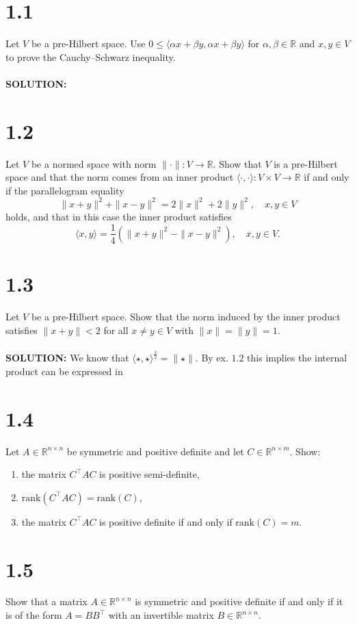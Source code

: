 \documentclass{article}
\begin{document}
\section*{1.1}
Let $V$ be a pre-Hilbert space. Use $0 \leq \langle \alpha x + \beta y, \alpha x + \beta y \rangle$ for $\alpha, \beta \in \mathbb{R}$ and $x, y \in V$ to prove the Cauchy–Schwarz inequality.
\\
\\
\noindent \textbf{SOLUTION: }

\section*{1.2}
Let $V$ be a normed space with norm $\| \cdot \| : V \to \mathbb{R}$. Show that $V$ is a pre-Hilbert space and that the norm comes from an inner product $\langle \cdot, \cdot \rangle : V \times V \to \mathbb{R}$ if and only if the parallelogram equality
\[
\|x + y\|^2 + \|x - y\|^2 = 2\|x\|^2 + 2\|y\|^2, \quad x, y \in V
\]
holds, and that in this case the inner product satisfies
\[
\langle x, y \rangle = \frac{1}{4} \left( \|x + y\|^2 - \|x - y\|^2 \right), \quad x, y \in V.
\]

\section*{1.3}
Let $V$ be a pre-Hilbert space. Show that the norm induced by the inner product satisfies $\|x + y\| < 2$ for all $x \neq y \in V$ with $\|x\| = \|y\| = 1$.
\\
\\
\noindent \textbf{SOLUTION: }
We know that $\langle \star, \star \rangle^{\frac{1}{2}} =  \| \star \|$. By ex. $1.2$ this implies the internal product can be expressed in 
\section*{1.4}
Let $A \in \mathbb{R}^{n \times n}$ be symmetric and positive definite and let $C \in \mathbb{R}^{n \times m}$. Show:
\begin{enumerate}
    \item the matrix $C^\top AC$ is positive semi-definite,
    \item $\text{rank}(C^\top AC) = \text{rank}(C)$,
    \item the matrix $C^\top AC$ is positive definite if and only if $\text{rank}(C) = m$.
\end{enumerate}

\section*{1.5}
Show that a matrix $A \in \mathbb{R}^{n \times n}$ is symmetric and positive definite if and only if it is of the form $A = B B^\top$ with an invertible matrix $B \in \mathbb{R}^{n \times n}$.
\end{document}
